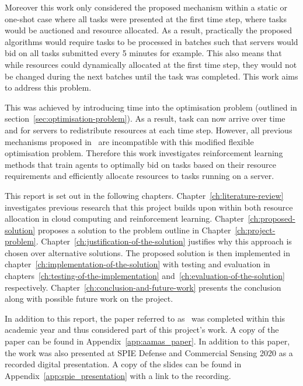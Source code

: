 Moreover this work only considered the proposed mechanism within a static or one-shot case where all tasks were presented
at the first time step, where tasks would be auctioned and resource allocated. As a result, practically the proposed
algorithms would require tasks to be processed in batches such that servers would bid on all tasks submitted every 5
minutes for example. This also means that while resources could dynamically allocated at the first time step, they
would not be changed during the next batches until the task was completed. This work aims to address this problem.

This was achieved by introducing time into the optimisation problem (outlined in section~\ref{sec:optimisation-problem}).
As a result, task can now arrive over time and for servers to redistribute resources at each time step. However, all
previous mechanisms proposed in~\cite{FlexibleResourceAllocation} are incompatible with this modified flexible
optimisation problem. Therefore this work investigates reinforcement learning methods that train agents to optimally
bid on tasks based on their resource requirements and efficiently allocate resources to tasks running on a server.

This report is set out in the following chapters. Chapter~\ref{ch:literature-review} investigates previous research
that this project builds upon within both resource allocation in cloud computing and reinforcement learning.
Chapter~\ref{ch:proposed-solution} proposes a solution to the problem outline in Chapter~\ref{ch:project-problem}.
Chapter~\ref{ch:justification-of-the-solution} justifies why this approach is chosen over alternative solutions.
The proposed solution is then implemented in chapter~\ref{ch:implementation-of-the-solution} with testing and
evaluation in chapters~\ref{ch:testing-of-the-implementation} and~\ref{ch:evaluation-of-the-solution} respectively.
Chapter~\ref{ch:conclusion-and-future-work} presents the conclusion along with possible future work on the project.

In addition to this report, the paper referred to as~\cite{FlexibleResourceAllocation} was completed within this
academic year and thus considered part of this project's work. A copy of the paper can be found in
Appendix~\ref{app:aamas_paper}. In addition to this paper, the work was also presented at SPIE Defense and Commercial
Sensing 2020 as a recorded digital presentation. A copy of the slides can be found in
Appendix~\ref{app:spie_presentation} with a link to the recording.

